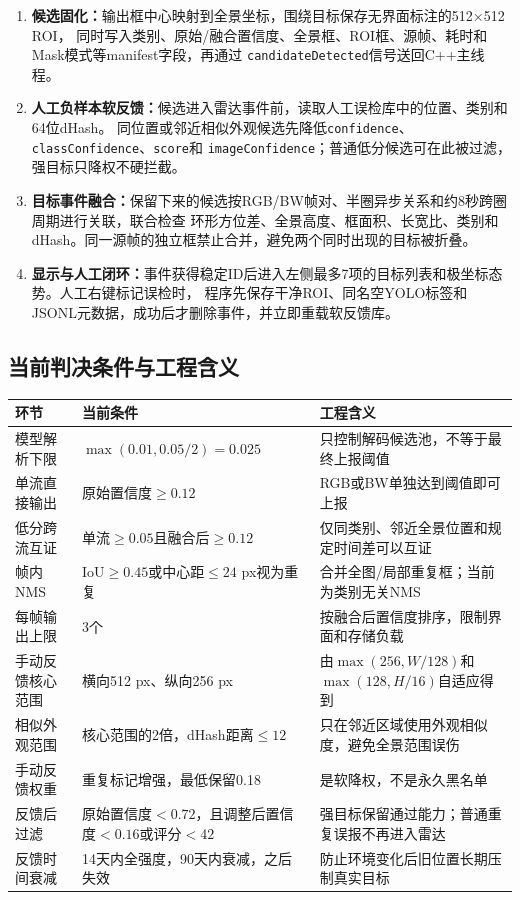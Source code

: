 \documentclass[UTF8,a4paper,11pt,openany]{ctexrep}
\begin{document}
\begin{enumerate}
  同类别历史框。互证要求时间差2.5--5.5 s、环形横向差不超过384 px、纵向差不超过256 px，融合置信度
  $c_f=1-(1-c_1)(1-c_2)$仍需达到0.12。每帧最多保留3个输出。
  \item \textbf{候选固化：}输出框中心映射到全景坐标，围绕目标保存无界面标注的512$\times$512 ROI，
  同时写入类别、原始/融合置信度、全景框、ROI框、源帧、耗时和Mask模式等manifest字段，再通过
  \texttt{candidateDetected}信号送回C++主线程。
  \item \textbf{人工负样本软反馈：}候选进入雷达事件前，读取人工误检库中的位置、类别和64位dHash。
  同位置或邻近相似外观候选先降低\texttt{confidence}、\texttt{classConfidence}、\texttt{score}和
  \texttt{imageConfidence}；普通低分候选可在此被过滤，强目标只降权不硬拦截。
  \item \textbf{目标事件融合：}保留下来的候选按RGB/BW帧对、半圈异步关系和约8秒跨圈周期进行关联，联合检查
  环形方位差、全景高度、框面积、长宽比、类别和dHash。同一源帧的独立框禁止合并，避免两个同时出现的目标被折叠。
  \item \textbf{显示与人工闭环：}事件获得稳定ID后进入左侧最多7项的目标列表和极坐标态势。人工右键标记误检时，
  程序先保存干净ROI、同名空YOLO标签和JSONL元数据，成功后才删除事件，并立即重载软反馈库。
\end{enumerate}

\subsection{当前判决条件与工程含义}

\begin{table}[H]
  \centering
  \small
  \begin{tabularx}{\textwidth}{p{3.7cm}p{4.5cm}X}
    \toprule
    环节 & 当前条件 & 工程含义 \\
    \midrule
    模型解析下限 & $\max(0.01,0.05/2)=0.025$ & 只控制解码候选池，不等于最终上报阈值 \\
    单流直接输出 & 原始置信度$\geq0.12$ & RGB或BW单独达到阈值即可上报 \\
    低分跨流互证 & 单流$\geq0.05$且融合后$\geq0.12$ & 仅同类别、邻近全景位置和规定时间差可以互证 \\
    帧内NMS & IoU$\geq0.45$或中心距$\leq24$ px视为重复 & 合并全图/局部重复框；当前为类别无关NMS \\
    每帧输出上限 & 3个 & 按融合后置信度排序，限制界面和存储负载 \\
    手动反馈核心范围 & 横向512 px、纵向256 px & 由$\max(256,W/128)$和$\max(128,H/16)$自适应得到 \\
    相似外观范围 & 核心范围的2倍，dHash距离$\leq12$ & 只在邻近区域使用外观相似度，避免全景范围误伤 \\
    手动反馈权重 & 重复标记增强，最低保留0.18 & 是软降权，不是永久黑名单 \\
    反馈后过滤 & 原始置信度$<0.72$，且调整后置信度$<0.16$或评分$<42$ & 强目标保留通过能力；普通重复误报不再进入雷达 \\
    反馈时间衰减 & 14天内全强度，90天内衰减，之后失效 & 防止环境变化后旧位置长期压制真实目标 \\
    \bottomrule
  \end{tabularx}
\end{table}
\end{document}
